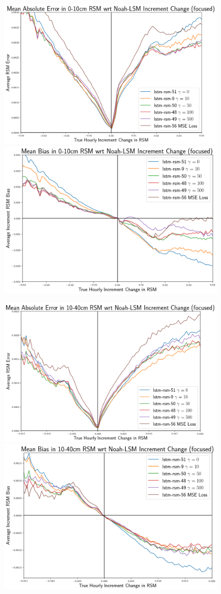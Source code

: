 \begin{figure}[hp!]
    \centering
    \includegraphics[width=.48\linewidth,draft=false]{figures/error-wrt-increment-change/eval_test_rsm-10_increment-error-1d-focus_abs-err.png}
    \includegraphics[width=.48\linewidth,draft=false]{figures/error-wrt-increment-change/eval_test_rsm-10_increment-error-1d-focus_bias.png}

    \includegraphics[width=.48\linewidth,draft=false]{figures/error-wrt-increment-change/eval_test_rsm-40_increment-error-1d-focus_abs-err.png}
    \includegraphics[width=.48\linewidth,draft=false]{figures/error-wrt-increment-change/eval_test_rsm-40_increment-error-1d-focus_bias.png}


\end{figure}

